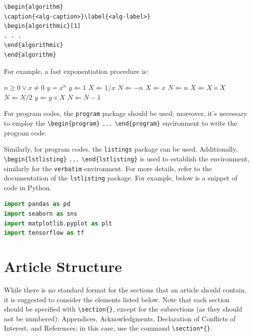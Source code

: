 \documentclass[letterpaper]{EmergentUDB}
\begin{document}
\begin{verbatim}
\begin{algorithm}
\caption{<alg-caption>}\label{<alg-label>}
\begin{algorithmic}[1]
. . .
\end{algorithmic}
\end{algorithm}
\end{verbatim}

For example, a fast exponentiation procedure is:
 
\begin{algorithm}[!h]
\caption{Calculate $y = x^n$}\label{algo1}
\begin{algorithmic}[1]
\Require $n \geq 0 \vee x \neq 0$
\Ensure $y = x^n$
\State $y \Leftarrow 1$
        \State $X \Leftarrow 1 / x$
        \State $N \Leftarrow -n$
\Else
        \State $X \Leftarrow x$
        \State $N \Leftarrow n$
\EndIf
{}
            \State $X \Leftarrow X \times X$
            \State $N \Leftarrow N / 2$
        \Else[$N$ is odd]
            \State $y \Leftarrow y \times X$
            \State $N \Leftarrow N - 1$
        \EndIf
\EndWhile
\end{algorithmic}
\end{algorithm}

For program codes, the \verb+program+ package should be used; moreover, it's necessary to employ the \verb+\begin{program}+ \verb+...+ \verb+\end{program}+ environment to write the program code.

Similarly, for program codes, the \verb+listings+ package can be used. Additionally, \verb+\begin{lstlisting}+ \verb+...+ \verb+\end{lstlisting}+ is used to establish the environment, similarly for the \verb+verbatim+ environment. For more details, refer to the documentation of the \verb+lstlisting+ package. For example, below is a snippet of code in Python.

\begin{lstlisting}[language=python]
import pandas as pd
import seaborn as sns
import matplotlib.pyplot as plt
import tensorflow as tf
\end{lstlisting}


\section{Article Structure}
While there is no standard format for the sections that an article should contain, it is suggested to consider the elements listed below. Note that each section should be specified with \verb|\section{}|, except for the subsections (as they should not be numbered): Appendices, Acknowledgments, Declaration of Conflicts of Interest, and References; in this case, use the command \verb|\section*{}|.
\end{document}
